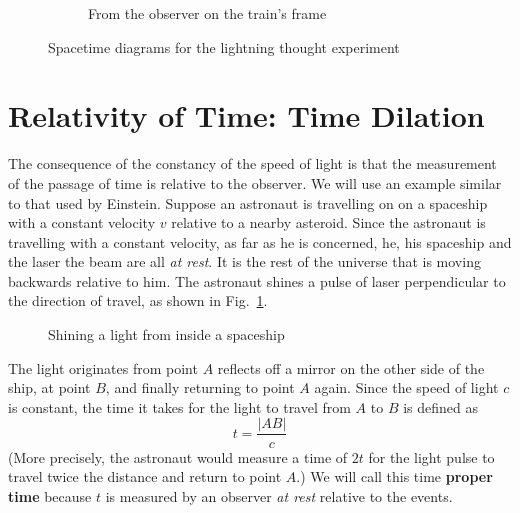 \begin{figure}[ht]
\begin{subfigure}{.45\linewidth}
    \caption{From the observer on the train's frame}
  \end{subfigure}
  \caption{Spacetime diagrams for the lightning thought experiment}
\end{figure}




\section{Relativity of Time: Time Dilation}
The consequence of the constancy of the speed of light is that the measurement
of the passage of time is relative to the observer. We will use an example
similar to that used by Einstein. Suppose an astronaut is travelling on 
on a spaceship with a constant velocity $v$ relative to a nearby asteroid.
Since the astronaut is travelling with a constant velocity, as far as he is
concerned, he, his spaceship and the laser the beam are all \emph{at rest}. It
is the rest of the universe that is moving backwards relative to him. The
astronaut shines a pulse of laser perpendicular to the direction of travel,
as shown in Fig.~\ref{fig:time-dilation1}.
\begin{figure}[ht]
  \centering
  \caption{Shining a light from inside a spaceship}
  \label{fig:time-dilation1}
\end{figure}
The light originates from point $A$ reflects off a mirror on the other side of
the ship, at point $B$, and finally returning to point $A$ again. Since the
speed of light $c$ is constant, the time it takes for the light to travel from
$A$ to $B$ is defined as
\begin{equation}
  t=\frac{|AB|}c
\end{equation}
(More precisely, the astronaut would measure a time of $2t$ for the light pulse
to travel twice the distance and return to point $A$.) We will call this time
\textbf{proper time} because $t$ is measured by an observer \emph{at rest}
relative to the events.

